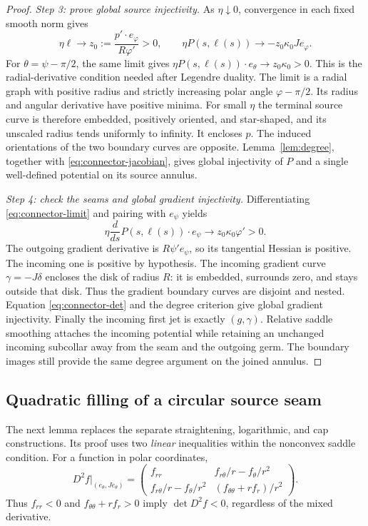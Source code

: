 \documentclass[11pt]{amsart}
\theoremstyle{definition}
\theoremstyle{remark}
\numberwithin{equation}{section}
\begin{document}
\begin{proof}
\emph{Step 3: prove global source injectivity.}
As $\eta\downarrow0$, convergence in each fixed smooth norm gives
\begin{equation}\label{eq:connector-limit}
 \eta\ell\longrightarrow z_0:=\frac{p'\cdot e_\varphi}{R\varphi'}>0,
 \qquad \eta P(s,\ell(s))\longrightarrow-z_0\kappa_0Je_\varphi.
\end{equation}
For $\theta=\psi-\pi/2$, the same limit gives
$\eta P(s,\ell(s))\cdot e_\theta\longrightarrow
z_0\kappa_0>0$. This is the radial-derivative condition needed after
Legendre duality. The limit is a radial graph with positive radius and
strictly increasing polar angle $\varphi-\pi/2$. Its radius and angular derivative have
positive minima. For small $\eta$ the terminal source curve is therefore
embedded, positively oriented, and star-shaped, and its unscaled radius
tends uniformly to infinity. It encloses $p$. The induced orientations
of the two boundary curves are opposite. Lemma~\ref{lem:degree}, together
with \eqref{eq:connector-jacobian}, gives global injectivity of $P$ and a
single well-defined potential on its source annulus.

\emph{Step 4: check the seams and global gradient injectivity.}
Differentiating \eqref{eq:connector-limit} and pairing with $e_\psi$ yields
\[
 \eta\frac d{ds}P(s,\ell(s))\cdot e_\psi
 \longrightarrow z_0\kappa_0\varphi'>0.
\]
The outgoing gradient derivative is $R\psi'e_\psi$, so its tangential
Hessian is positive. The incoming one is positive by hypothesis.
The incoming gradient curve $\gamma=-J\delta$ encloses the disk of
radius $R$: it is embedded, surrounds zero, and stays outside that disk.
Thus the gradient boundary curves are disjoint and nested. Equation
\eqref{eq:connector-det} and the degree criterion give global gradient
injectivity. Finally the incoming first jet is exactly $(g,\gamma)$.
Relative saddle smoothing attaches the incoming potential while retaining
an unchanged incoming subcollar away from the seam and the outgoing germ. The boundary
images still provide the same degree argument on the joined annulus.
\end{proof}


\subsection{Quadratic filling of a circular source seam}
The next lemma replaces the separate straightening, logarithmic, and cap
constructions. Its proof uses two \emph{linear} inequalities within the
nonconvex saddle condition. For a function in polar coordinates,
\begin{equation}\label{eq:polar-hessian}
 D^2 f\big|_{(e_\theta,Je_\theta)}=
 \begin{pmatrix}
 f_{rr}& f_{r\theta}/r-f_\theta/r^2\\
 f_{r\theta}/r-f_\theta/r^2&(f_{\theta\theta}+rf_r)/r^2
 \end{pmatrix}.
\end{equation}
Thus $f_{rr}<0$ and $f_{\theta\theta}+rf_r>0$ imply
$\det D^2f<0$, regardless of the mixed derivative.
\end{document}
